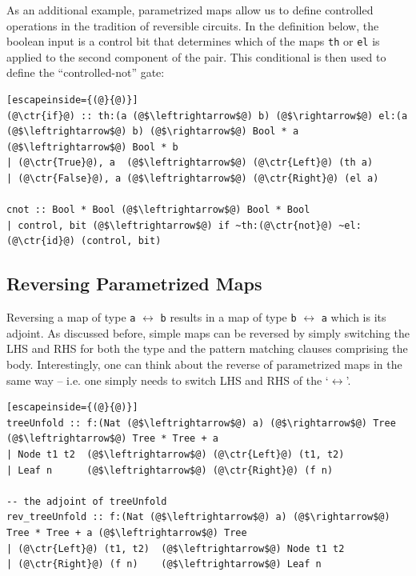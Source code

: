 \documentclass{article}
\newcommand{\ctr}[1]{{\scriptsize{\texttt{#1}}}}
\begin{document}
As an additional example, parametrized maps allow us to define controlled
operations in the tradition of reversible circuits. In the definition below,
the boolean input is a control bit that determines which of the maps \ctr{th}
or \ctr{el} is applied to the second component of the pair. This conditional
is then used to define the ``controlled-not'' gate:

\begin{lstlisting}[escapeinside={(@}{@)}]
(@\ctr{if}@) :: th:(a (@$\leftrightarrow$@) b) (@$\rightarrow$@) el:(a (@$\leftrightarrow$@) b) (@$\rightarrow$@) Bool * a (@$\leftrightarrow$@) Bool * b
| (@\ctr{True}@), a  (@$\leftrightarrow$@) (@\ctr{Left}@) (th a)
| (@\ctr{False}@), a (@$\leftrightarrow$@) (@\ctr{Right}@) (el a)

cnot :: Bool * Bool (@$\leftrightarrow$@) Bool * Bool
| control, bit (@$\leftrightarrow$@) if ~th:(@\ctr{not}@) ~el:(@\ctr{id}@) (control, bit)
 \end{lstlisting}

\subsection{Reversing Parametrized Maps}

Reversing a map of type \ctr{a} $\leftrightarrow$ \ctr{b} results in a map of
type \ctr{b} $\leftrightarrow$ \ctr{a} which is its adjoint. As discussed
before, simple maps can be reversed by simply switching the LHS and RHS for
both the type and the pattern matching clauses comprising the
body. Interestingly, one can think about the reverse of parametrized maps in
the same way -- i.e. one simply needs to switch LHS and RHS of the `\ensuremath{\leftrightarrow}'.

\begin{lstlisting}[escapeinside={(@}{@)}]
treeUnfold :: f:(Nat (@$\leftrightarrow$@) a) (@$\rightarrow$@) Tree (@$\leftrightarrow$@) Tree * Tree + a
| Node t1 t2  (@$\leftrightarrow$@) (@\ctr{Left}@) (t1, t2)
| Leaf n      (@$\leftrightarrow$@) (@\ctr{Right}@) (f n)

-- the adjoint of treeUnfold
rev_treeUnfold :: f:(Nat (@$\leftrightarrow$@) a) (@$\rightarrow$@) Tree * Tree + a (@$\leftrightarrow$@) Tree
| (@\ctr{Left}@) (t1, t2)  (@$\leftrightarrow$@) Node t1 t2
| (@\ctr{Right}@) (f n)    (@$\leftrightarrow$@) Leaf n
 \end{lstlisting}
\end{document}
